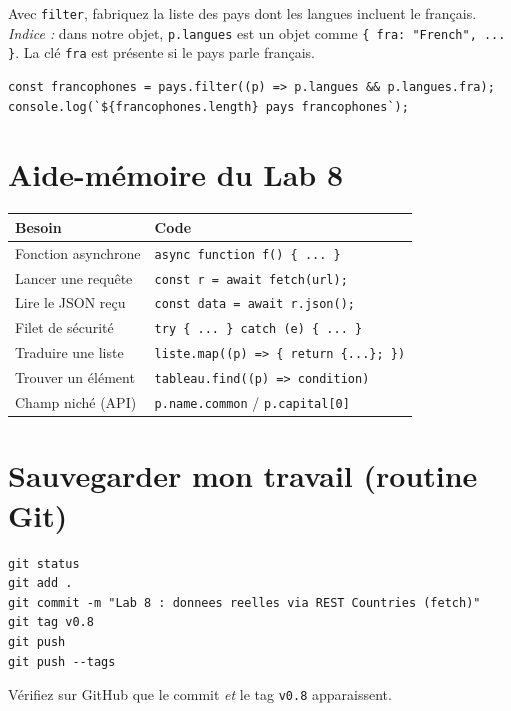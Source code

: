 \documentclass[11pt,a4paper]{article}
\newcommand{\code}[1]{\texttt{#1}}
\begin{document}
\begin{objectifbox}
Avec \code{filter}, fabriquez la liste des pays dont les langues incluent le français.\\
\emph{Indice :} dans notre objet, \code{p.langues} est un objet comme \code{\{ fra: "French", ... \}}. La clé \code{fra} est présente si le pays parle français.
\end{objectifbox}

\begin{lstlisting}[style=js]
const francophones = pays.filter((p) => p.langues && p.langues.fra);
console.log(`${francophones.length} pays francophones`);
\end{lstlisting}

\section{Aide-mémoire du Lab 8}

\begin{center}
\begin{tabular}{p{5.4cm} p{7.6cm}}
\toprule
\textbf{Besoin} & \textbf{Code} \\
\midrule
Fonction asynchrone & \code{async function f() \{ ... \}} \\
Lancer une requête & \code{const r = await fetch(url);} \\
Lire le JSON reçu & \code{const data = await r.json();} \\
Filet de sécurité & \code{try \{ ... \} catch (e) \{ ... \}} \\
Traduire une liste & \code{liste.map((p) => \{ return \{...\}; \})} \\
Trouver un élément & \code{tableau.find((p) => condition)} \\
Champ niché (API) & \code{p.name.common} \quad / \quad \code{p.capital[0]} \\
\bottomrule
\end{tabular}
\end{center}

\section{Sauvegarder mon travail (routine Git)}

\begin{retenirbox}
\begin{lstlisting}[style=html]
git status
git add .
git commit -m "Lab 8 : donnees reelles via REST Countries (fetch)"
git tag v0.8
git push
git push --tags
\end{lstlisting}
Vérifiez sur GitHub que le commit \emph{et} le tag \code{v0.8} apparaissent.
\end{retenirbox}
\end{document}
